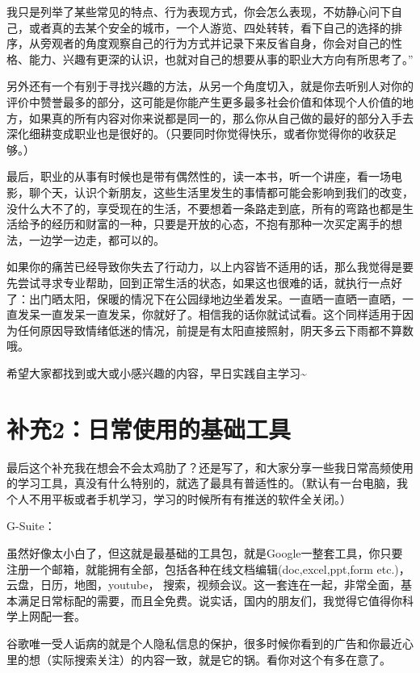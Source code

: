 \documentclass[
]{book}
\begin{document}
我只是列举了某些常见的特点、行为表现方式，你会怎么表现，不妨静心问下自己，或者真的去某个安全的城市，一个人游览、四处转转，看下自己的选择的排序，从旁观者的角度观察自己的行为方式并记录下来反省自身，你会对自己的性格、能力、兴趣有更深的认识，也就对自己的想要从事的职业大方向有所思考了。''

另外还有一个有别于寻找兴趣的方法，从另一个角度切入，就是你去听别人对你的评价中赞誉最多的部分，这可能是你能产生更多最多社会价值和体现个人价值的地方，如果真的所有内容对你来说都是同一的，那么你从自己做的最好的部分入手去深化细耕变成职业也是很好的。（只要同时你觉得快乐，或者你觉得你的收获足够。）

最后，职业的从事有时候也是带有偶然性的，读一本书，听一个讲座，看一场电影，聊个天，认识个新朋友，这些生活里发生的事情都可能会影响到我们的改变，没什么大不了的，享受现在的生活，不要想着一条路走到底，所有的弯路也都是生活给予的经历和财富的一种，只要是开放的心态，不抱有那种一次买定离手的想法，一边学一边走，都可以的。

如果你的痛苦已经导致你失去了行动力，以上内容皆不适用的话，那么我觉得是要先尝试寻求专业帮助，回到正常生活的状态，如果这也很难的话，就执行一点好了：出门晒太阳，保暖的情况下在公园绿地边坐着发呆。一直晒一直晒一直晒，一直发呆一直发呆一直发呆，你就好了。相信我的话你就试试看。这个同样适用于因为任何原因导致情绪低迷的情况，前提是有太阳直接照射，阴天多云下雨都不算数哦。

希望大家都找到或大或小感兴趣的内容，早日实践自主学习\textasciitilde{}

\hypertarget{ux8865ux51452ux65e5ux5e38ux4f7fux7528ux7684ux57faux7840ux5de5ux5177}{%
\chapter{补充2：日常使用的基础工具}\label{ux8865ux51452ux65e5ux5e38ux4f7fux7528ux7684ux57faux7840ux5de5ux5177}}

最后这个补充我在想会不会太鸡肋了？还是写了，和大家分享一些我日常高频使用的学习工具，真没有什么特别的，就选了最具有普适性的。（默认有一台电脑，我个人不用平板或者手机学习，学习的时候所有有推送的软件全关闭。）

G-Suite：

虽然好像太小白了，但这就是最基础的工具包，就是Google一整套工具，你只要注册一个邮箱，就能拥有全部，包括各种在线文档编辑(doc,excel,ppt,form etc.)，云盘，日历，地图，youtube， 搜索，视频会议。这一套连在一起，非常全面，基本满足日常标配的需要，而且全免费。说实话，国内的朋友们，我觉得它值得你科学上网配一套。

谷歌唯一受人诟病的就是个人隐私信息的保护，很多时候你看到的广告和你最近心里的想（实际搜索关注）的内容一致，就是它的锅。看你对这个有多在意了。
\end{document}
